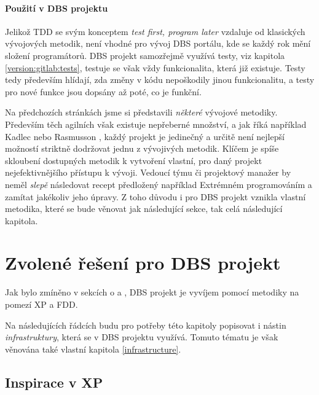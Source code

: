 \paragraph{Použití v DBS projektu}
Jelikož TDD se svým konceptem \emph{test first, program later} vzdaluje od klasických vývojových metodik, není vhodné pro vývoj DBS portálu, kde se každý rok mění složení programátorů. DBS projekt samozřejmě využívá testy, viz kapitola \ref{version:gitlab:tests}, testuje se však vždy funkcionalita, která již existuje. Testy tedy především hlídají, zda změny v kódu nepoškodily jinou funkcionalitu, a testy pro nové funkce jsou dopsány až poté, co je funkční.



Na předchozích stránkách jsme si představili \emph{některé} vývojové metodiky. Především těch agilních však existuje nepřeberné množství, a jak říká například Kadlec \cite{kadlec} nebo Rasmusson \cite{rasmusson}, každý projekt je jedinečný a určitě není nejlepší možností striktně dodržovat jednu z vývojivých metodik. Klíčem je spíše skloubení dostupných metodik k vytvoření vlastní, pro daný projekt nejefektivnějšího přístupu k vývoji. Vedoucí týmu či projektový manažer by neměl \emph{slepě} následovat recept předložený například Extrémném programováním a zamítat jakékoliv jeho úpravy. Z toho důvodu i pro DBS projekt vznikla vlastní metodika, které se bude věnovat jak následující sekce, tak celá následující kapitola.


\section{Zvolené řešení pro DBS projekt} \label{methods:dbs}

Jak bylo zmíněno v sekcích o \emph{} a \emph{}, DBS projekt je vyvíjem pomocí metodiky na pomezí XP a FDD.

Na následujících řádcích budu pro potřeby této kapitoly popisovat i nástin \emph{infrastruktury}, která se v DBS projektu využívá. Tomuto tématu je však věnována také vlastní kapitola \ref{infrastructure}.


\subsection{Inspirace v XP}

